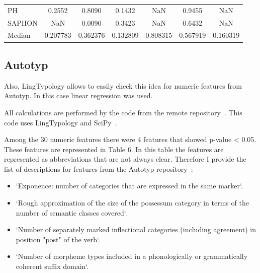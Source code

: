 \documentclass[a4paper,12pt]{article}
\begin{document}
\begin{minipage}{\textwidth}
\begin{adjustbox}{max width=\textwidth}
\begin{tabular}{ | l | c c c c c c |}
    PH &             0.2552 &        0.8090 &             0.1432 &       NaN &                 0.9455 &       NaN \\
    SAPHON &                NaN &        0.0090 &             0.3423 &       NaN &                 0.6432 &       NaN \\
    \midrule
    Median &           0.207783 &      0.362376 &           0.132809 &  0.808315 &               0.567919 &  0.160319 \\
    \bottomrule
\end{tabular}
\end{adjustbox}
\end{minipage}
\bigskip

\subsection{Autotyp}

Also, LingTypology allows to easily check this idea for numeric features from Autotyp. In this case linear regression was used.

All calculations are performed by the code from the remote repository~\parencite[PHOIBLE: Quantitative Research.ipynb]{lingtypologyResearch}. This code uses LingTypology and SciPy~\parencite{scipy}.

Among the 30 numeric features there were 4 features that showed p-value < 0.05.
These features are represented in Table 6. In this table the features are represented as abbreviations that are not always clear. Therefore I provide the list of descriptions for features from the Autotyp repository~\parencite[metadata\_overview.csv]{autotyp}:
\begin{itemize}
 \item `Exponence: number of categories that are expressed in the same marker`.
 \item `Rough approximation of the size of the possessum category in terms of the number of semantic classes covered`.
 \item `Number of separately marked inflectional categories (including agreement) in position "post" of the verb`.
 \item `Number of morpheme types included in a phonologically or grammatically coherent suffix domain`.
\end{itemize}
\end{document}
